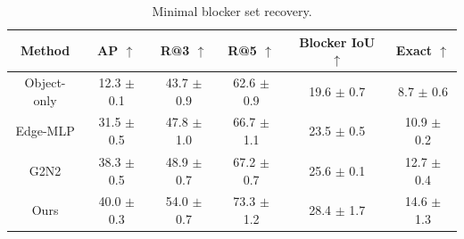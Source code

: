 \begin{table}[htbp]
  \centering
  \caption{Minimal blocker set recovery.}
  \label{tab:stage2_mbs_recovery}
  \small
  \setlength{\tabcolsep}{4.5pt}
  \begin{tabular}{cccccc}
    \toprule
    Method & AP $\uparrow$ & R@3 $\uparrow$ & R@5 $\uparrow$ & Blocker IoU $\uparrow$ & Exact $\uparrow$ \\
    \midrule
    Object-only & 12.3 $\pm$ 0.1 & 43.7 $\pm$ 0.9 & 62.6 $\pm$ 0.9 & 19.6 $\pm$ 0.7 & 8.7 $\pm$ 0.6 \\
    Edge-MLP & 31.5 $\pm$ 0.5 & 47.8 $\pm$ 1.0 & 66.7 $\pm$ 1.1 & 23.5 $\pm$ 0.5 & 10.9 $\pm$ 0.2 \\
    G2N2 & 38.3 $\pm$ 0.5 & 48.9 $\pm$ 0.7 & 67.2 $\pm$ 0.7 & 25.6 $\pm$ 0.1 & 12.7 $\pm$ 0.4 \\
    Ours & 40.0 $\pm$ 0.3 & 54.0 $\pm$ 0.7 & 73.3 $\pm$ 1.2 & 28.4 $\pm$ 1.7 & 14.6 $\pm$ 1.3 \\
    \bottomrule
  \end{tabular}
  \vspace{2pt}
  \begin{minipage}{\linewidth}
    
  \end{minipage}
\end{table}
